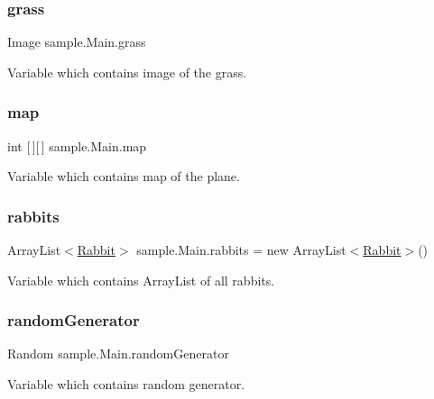 \subsubsection{\texorpdfstring{grass}{grass}}
{\footnotesize\ttfamily Image sample.\+Main.\+grass}

Variable which contains image of the grass. \mbox{\label{classsample_1_1_main_a3c889cc347cd6f3c1304d49d59e017e2}} 
\subsubsection{\texorpdfstring{map}{map}}
{\footnotesize\ttfamily int \mbox{[}$\,$\mbox{]}\mbox{[}$\,$\mbox{]} sample.\+Main.\+map}

Variable which contains map of the plane. \mbox{\label{classsample_1_1_main_acd6e55598950bbd7e3b1677620ac458f}} 
\subsubsection{\texorpdfstring{rabbits}{rabbits}}
{\footnotesize\ttfamily Array\+List$<$\hyperlink{classsample_1_1_rabbit}{Rabbit}$>$ sample.\+Main.\+rabbits = new Array\+List$<$\hyperlink{classsample_1_1_rabbit}{Rabbit}$>$()}

Variable which contains Array\+List of all rabbits. \mbox{\label{classsample_1_1_main_aa2761a84f13a2da2af9382da036fb8c2}} 
\subsubsection{\texorpdfstring{random\+Generator}{randomGenerator}}
{\footnotesize\ttfamily Random sample.\+Main.\+random\+Generator}

Variable which contains random generator. \mbox{\label{classsample_1_1_main_ad45209d84c8ed6bb0f012ea1713e4afc}} 
